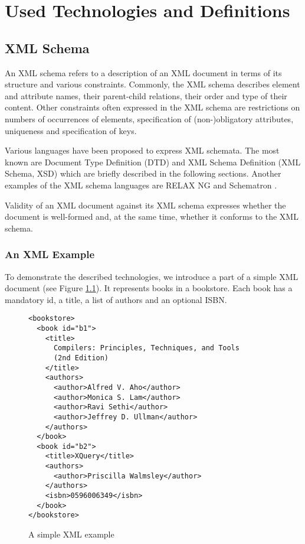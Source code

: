 \chapter{Used Technologies and Definitions}

\section{XML Schema}
An XML schema refers to a description of an XML document in terms of its structure and various constraints. Commonly, the XML schema describes element and attribute names, their parent-child relations, their order and type of their content. Other constraints often expressed in the XML schema are restrictions on numbers of occurrences of elements, specification of (non-)obligatory attributes, uniqueness and specification of keys.

Various languages have been proposed to express XML schemata. The most known are Document Type Definition (DTD) \cite{Bray:08:EML} and XML Schema Definition (XML Schema, XSD) \cite{Walmsley:04:XSP, Thompson:04:XSP, Malhotra:04:XSP} which are briefly described in the following sections. Another examples of the XML schema languages are RELAX NG \cite{relaxng} and  Schematron \cite{schematron}.

Validity of an XML document against its XML schema expresses whether the document is well-formed \cite{Bray:08:EML} and, at the same time, whether it conforms to the XML schema.

\subsection{An XML Example}
To demonstrate the described technologies, we introduce a part of a simple XML document (see Figure \ref{FIG_a_simple_xml_example}). It represents books in a bookstore. Each book has a mandatory id, a title, a list of authors and an optional ISBN.

\begin{figure}
\begin{verbatim}
<bookstore>
  <book id="b1">
    <title>
      Compilers: Principles, Techniques, and Tools
      (2nd Edition)
    </title>
    <authors>
      <author>Alfred V. Aho</author>
      <author>Monica S. Lam</author>
      <author>Ravi Sethi</author>
      <author>Jeffrey D. Ullman</author>
    </authors>
  </book>
  <book id="b2">
    <title>XQuery</title>
    <authors>
      <author>Priscilla Walmsley</author>
    </authors>
    <isbn>0596006349</isbn>
  </book>
</bookstore>
\end{verbatim}
\caption{A simple XML example}
\label{FIG_a_simple_xml_example}
\end{figure}

